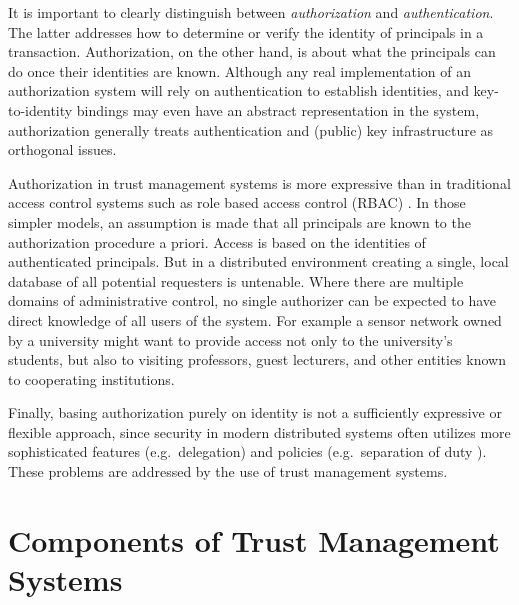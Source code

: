 It is important to clearly distinguish between \emph{authorization} and \emph{authentication}.
The latter addresses how to determine or verify the identity of principals in a transaction.
Authorization, on the other hand, is about what the principals can do once their identities are
known. Although any real implementation of an authorization system will rely on authentication
to establish identities, and key-to-identity bindings may even have an abstract representation
in the system, authorization generally treats authentication and (public) key infrastructure as
orthogonal issues.

Authorization in trust management systems is more expressive than in traditional access control
systems such as role based access control (RBAC) \cite{Sandhu:RBACM}. In those simpler models,
an assumption is made that all principals are known to the authorization procedure a priori.
Access is based on the identities of authenticated principals. But in a distributed environment
creating a single, local database of all potential requesters is untenable. Where there are
multiple domains of administrative control, no single authorizer can be expected to have direct
knowledge of all users of the system. For example a sensor network owned by a university might
want to provide access not only to the university's students, but also to visiting professors,
guest lecturers, and other entities known to cooperating institutions.

Finally, basing authorization purely on identity is not a sufficiently expressive or flexible
approach, since security in modern distributed systems often utilizes more sophisticated
features (e.g.~delegation) and policies (e.g.~separation of duty \cite{Simon:SODRBE}). These
problems are addressed by the use of trust management systems.

\section{Components of Trust Management Systems}
\label{section-components}

